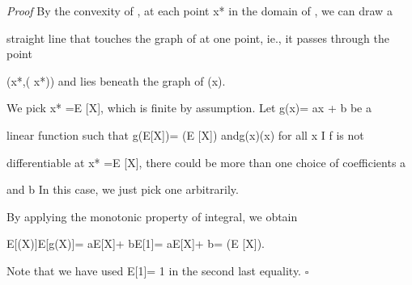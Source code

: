 \textit{Proof} By the convexity of \phi, at each point x* in the domain of \phi, we can draw a

straight line that touches the graph of \phi at one point, ie., it passes through the point

(x*,\phi( x*)) and lies beneath the graph of \phi(x).

We pick x* =E [X], which is finite by assumption. Let g(x)= ax + b be a

linear function such that g(E[X])= \phi(E [X]) andg(x)\leq \phi(x) for all x I f \phi is not

differentiable at x* =E [X], there could be more than one choice of coefficients a

and b In this case, we just pick one arbitrarily.

By applying the monotonic property of integral, we obtain

E[\phi(X)]\geq E[g(X)]= aE[X]+ bE[1]= aE[X]+ b= \phi(E [X]).

Note that we have used E[1]= 1 in the second last equality. \hfill $\square$
